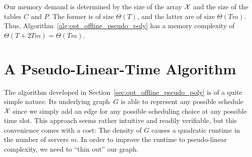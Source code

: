Our memory demand is determined by the size of the array $\mathcal{X}$ and the size of the tables $C$ and $P$. The former is of size $\Theta(T)$, and the latter are of size $\Theta(Tm)$. Thus, Algorithm~\ref{alg:opt_offline_pseudo_poly} has a memory complexity of $\Theta(T+2Tm)=\Theta(Tm)$.

\section{A Pseudo-Linear-Time Algorithm}\label{sec:opt_offline_pseudo_lin}
The algorithm developed in Section~\ref{sec:opt_offline_pseudo_poly} is of a quite simple nature. Its underlying graph~$G$ is able to represent any possible schedule $\mathcal{X}$ since we simply add an edge for any possible scheduling choice at any possible time slot. This approach seems rather intuitive and readily verifiable, but this convenience comes with a cost: The density of $G$ causes a quadratic runtime in the number of servers $m$. In order to improve the runtime to pseudo-linear complexity, we need to ``thin out'' our graph. 

